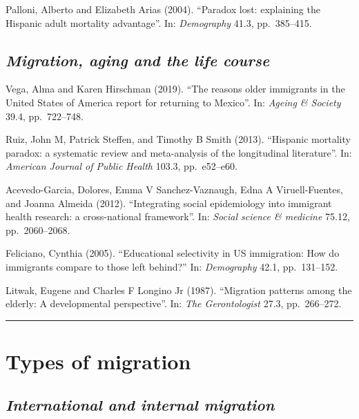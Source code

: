 \documentclass[
  12pt,
]{article}
\begin{document}
Palloni, Alberto and Elizabeth Arias (2004). ``Paradox lost: explaining
the Hispanic adult mortality advantage''. In: \emph{Demography} 41.3,
pp.~385--415.

\hypertarget{migration-aging-and-the-life-course}{%
\subsection{\texorpdfstring{\emph{Migration, aging and the life
course}}{Migration, aging and the life course}}\label{migration-aging-and-the-life-course}}

Vega, Alma and Karen Hirschman (2019). ``The reasons older immigrants in
the United States of America report for returning to Mexico''. In:
\emph{Ageing \& Society} 39.4, pp.~722--748.

Ruiz, John M, Patrick Steffen, and Timothy B Smith (2013). ``Hispanic
mortality paradox: a systematic review and meta-analysis of the
longitudinal literature''. In: \emph{American Journal of Public Health}
103.3, pp.~e52--e60.

Acevedo-Garcia, Dolores, Emma V Sanchez-Vaznaugh, Edna A
Viruell-Fuentes, and Joanna Almeida (2012). ``Integrating social
epidemiology into immigrant health research: a cross-national
framework''. In: \emph{Social science \& medicine} 75.12,
pp.~2060--2068.

Feliciano, Cynthia (2005). ``Educational selectivity in US immigration:
How do immigrants compare to those left behind?'' In: \emph{Demography}
42.1, pp.~131--152.

Litwak, Eugene and Charles F Longino Jr (1987). ``Migration patterns
among the elderly: A developmental perspective''. In:
\emph{The Gerontologist} 27.3, pp.~266--272.

\begin{center}\rule{0.5\linewidth}{0.5pt}\end{center}

\hypertarget{types-of-migration}{%
\section{\texorpdfstring{\textbf{Types of migration
}}{Types of migration }}\label{types-of-migration}}

\hypertarget{international-and-internal-migration}{%
\subsection{\texorpdfstring{\emph{International and internal
migration}}{International and internal migration}}\label{international-and-internal-migration}}
\end{document}
